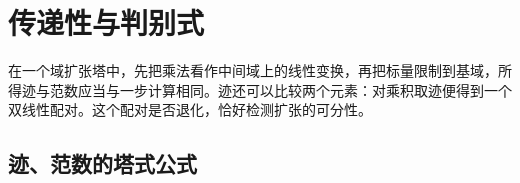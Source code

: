 
\section{传递性与判别式}
\label{b1:sec:1803}

%
%

在一个域扩张塔中，先把乘法看作中间域上的线性变换，再把标量限制到基域，所得迹与范数应当与一步计算相同。迹还可以比较两个元素：对乘积取迹便得到一个双线性配对。这个配对是否退化，恰好检测扩张的可分性。

\subsection{迹、范数的塔式公式}
\label{b1:subsec:1803:01}

